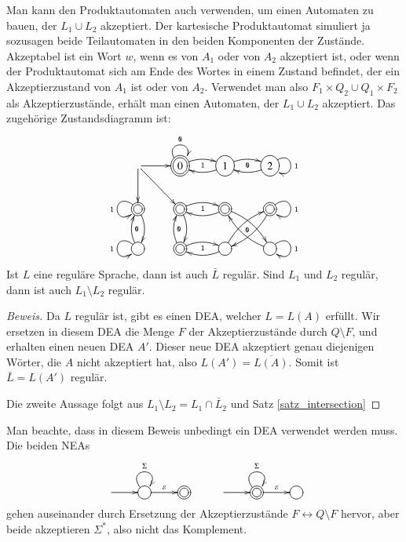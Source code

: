 Man kann den Produktautomaten auch
verwenden, um einen Automaten zu bauen, der $L_1\cup L_2$
akzeptiert.
Der kartesische Produktautomat simuliert ja sozusagen
beide Teilautomaten in den beiden Komponenten der Zustände.
Akzeptabel ist ein Wort $w$, wenn es von $A_1$
oder von $A_2$ akzeptiert ist, oder wenn der Produktautomat
sich am Ende des Wortes in einem Zustand befindet, der ein
Akzeptierzustand von $A_1$ ist oder von $A_2$.
Verwendet
man also $F_1\times Q_2\cup Q_1\times F_2$ als Akzeptierzustände,
erhält man einen Automaten, der $L_1\cup L_2$ akzeptiert.
Das zugehörige Zustandsdiagramm ist:
\[
\entrymodifiers={++[o][F]}
\xymatrix{
*+\txt{} \ar[r] \ar[d] \ar[dr]
	&*++[o][F=]{0} \ar@/^/[r]_{\tt 1} \ar@(ul,ur)^{\tt 0}
		&{1} \ar@/^/[l] \ar@/^/[r]_{\tt 0}
			&{2}\ar@(ur,dr)^{\tt 1} \ar@/^/[l]
\\
*++[o][F=]{} \ar@/^/[d] \ar@(ul,dl)_{\tt 1}
	&*++[o][F=]{} \ar@/^/[d]{\tt 0} \ar@/^/[r]_{\tt 1}
		&*++[o][F=]{} \ar@/^/[l] \ar@/^/[dr]_{\tt 0}
			&*++[o][F=]{}\ar@(ur,dr)^{\tt 1} \ar@/^/[dl]
\\
{} \ar@/^/[u]_{\tt 0} \ar@(ul,dl)_{\tt 1}
	&*++[o][F=]{} \ar@/^/[u]_{\tt 0} \ar@/^/[r]_{\tt 1}
		&{} \ar@/^/[l] \ar@/^/[ur]
			&{}\ar@(ur,dr)^{\tt 1} \ar@/^/[ul]
}
\]

\begin{satz}
\label{satz_regcomplement}
Ist $L$ eine reguläre Sprache, dann ist auch $\bar L$ regulär.
Sind $L_1$ und $L_2$ regulär, dann ist auch $L_1\setminus L_2$
regulär.
\end{satz}

\begin{proof}[Beweis]
Da $L$ regulär ist, gibt es einen DEA, welcher $L=L(A)$ erfüllt.
Wir ersetzen in diesem DEA die Menge $F$ der Akzeptierzustände
durch $Q\setminus F$, und erhalten einen neuen DEA $A'$.
Dieser neue DEA akzeptiert genau diejenigen Wörter, die $A$ nicht
akzeptiert hat, also $L(A')=\overline{L(A)}$.
Somit ist $\bar L=L(A')$ regulär.

Die zweite Aussage folgt aus $L_1\setminus L_2=L_1\cap\bar L_2$ und
Satz \ref{satz_intersection}
\end{proof}
Man beachte, dass in diesem Beweis unbedingt ein DEA verwendet werden
muss.
Die beiden NEAs
\[
\entrymodifiers={++[o][F]}
\xymatrix{
*+\txt{}\ar[r]
	&{}\ar@(ul,ur)^{\Sigma} \ar[r]^{\varepsilon}
		&*++[o][F=]{}
&
*+\txt{}\ar[r]
	&*++[o][F=]{}\ar@(ul,ur)^{\Sigma} \ar[r]^{\varepsilon}
		&{}
}
\]
gehen auseinander durch Ersetzung der Akzeptierzustände
$F\leftrightarrow Q\setminus F$ hervor, aber beide akzeptieren
$\Sigma^*$, also nicht das Komplement.

